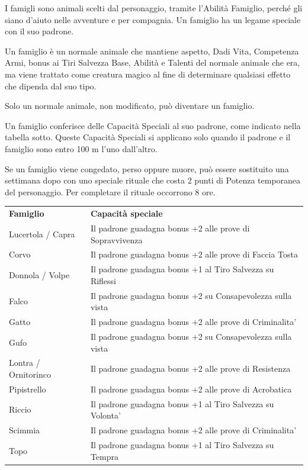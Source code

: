 \documentclass[a4paper,11pt,twoside,openany]{book}
\begin{document}
I famigli sono animali scelti dal personaggio, tramite l'Abilità Famiglio, perché gli siano d'aiuto nelle avventure e per compagnia. Un famiglio ha un legame speciale con il suo padrone.

Un famiglio è un normale animale che mantiene aspetto, Dadi Vita, Competenza Armi, bonus ai Tiri Salvezza Base, Abilità e Talenti del normale animale che era, ma viene trattato come creatura magico al fine di determinare qualsiasi effetto che dipenda dal suo tipo.

Solo un normale animale, non modificato, può diventare un famiglio.

Un famiglio conferisce delle Capacità Speciali al suo padrone, come indicato nella tabella sotto. Queste Capacità Speciali si applicano solo quando il padrone e il famiglio sono entro 100 m l'uno dall'altro.

Se un famiglio viene congedato, perso oppure muore, può essere sostituito una settimana dopo con uno speciale rituale che costa 2 punti di Potenza temporanea del personaggio. Per completare il rituale occorrono 8 ore.

\bigskip

\begin{tabularx}{0.95\textwidth}{lX}
	\toprule
	\textbf{Famiglio}                & \textbf{Capacità speciale}\\
	Lucertola / Capra    & Il padrone guadagna bonus +2 alle prove di Sopravvivenza\\
	Corvo                & Il padrone guadagna bonus +2 alle prove di Faccia Tosta\\
	Donnola / Volpe      & Il padrone guadagna bonus +1 al Tiro Salvezza su Riflessi\\
	Falco                & Il padrone guadagna bonus +2 su Consapevolezza sulla vista\\
	Gatto                & Il padrone guadagna bonus +2 alle prove di Criminalita'\\
	Gufo                 & Il padrone guadagna bonus +2 su Consapevolezza sulla vista\\
	Lontra / Ornitorinco & Il padrone guadagna bonus +2 alle prove di Resistenza\\
	Pipistrello          & Il padrone guadagna bonus +2 alle prove di Acrobatica\\
	Riccio               & Il padrone guadagna bonus +1 al Tiro Salvezza su Volonta'\\
	Scimmia              & Il padrone guadagna bonus +2 alle prove di Criminalita'\\
	Topo                 & Il padrone guadagna bonus +1 al Tiro Salvezza su Tempra\\
\end{tabularx}
\end{document}
